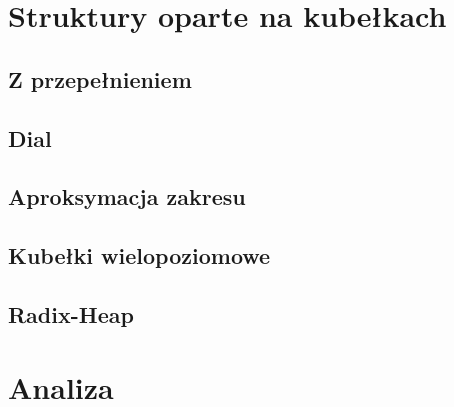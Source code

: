 
\section{Struktury oparte na kubełkach}
\label{sec:dijkstraBuckets}

\subsection{Z przepełnieniem}


\subsection{Dial}


\subsection{Aproksymacja zakresu}


\subsection{Kubełki wielopoziomowe}


\subsection{Radix-Heap}


\section{Analiza}


